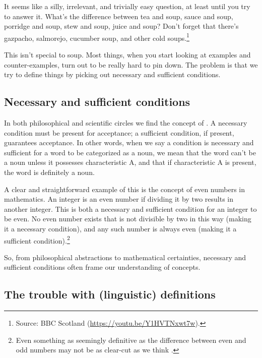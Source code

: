 It seems like a silly, irrelevant, and trivially easy question, at least until you try to answer it. What's the difference between tea and soup, sauce and soup, porridge and soup, stew and soup, juice and soup? Don't forget that there's gazpacho, salmorejo, cucumber soup, and other cold soups.\footnote{Source: BBC Scotland (\url{https://youtu.be/Y1HVTNxwt7w}).}

This isn't special to soup. Most things, when you start looking at examples and counter-examples, turn out to be really hard to pin down. The problem is that we try to define things by picking out necessary and sufficient conditions.

\subsection{Necessary and sufficient conditions}\label{sec:conditions}

In both philosophical and scientific circles we find the concept of . A necessary condition must be present for acceptance; a sufficient condition, if present, guarantees acceptance. In other words, when we say a condition is necessary and sufficient for a word to be categorized as a noun, we mean that the word can't be a noun unless it possesses characteristic A, and that if characteristic A is present, the word is definitely a noun.

A clear and straightforward example of this is the concept of even numbers in mathematics. An integer is an even number if dividing it by two results in another integer. This is both a necessary and sufficient condition for an integer to be even. No even number exists that is not divisible by two in this way (making it a necessary condition), and any such number is always even (making it a sufficient condition).\footnote{Even something as seemingly definitive as the difference between even and odd numbers may not be as clear-cut as we think \autocite{Heubner2018}.}

So, from philosophical abstractions to mathematical certainties, necessary and sufficient conditions often frame our understanding of concepts.

\subsection{The trouble with (linguistic) definitions}\label{sec:definitions}

